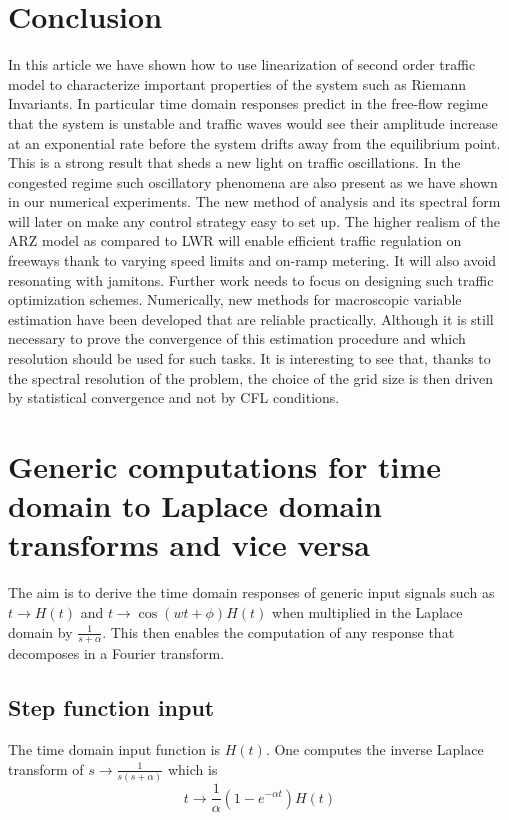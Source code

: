 \documentclass[preprint]{elsarticle}
\begin{document}
\section{Conclusion}
In this article we have shown how to use linearization of second order traffic model to characterize important properties of the system such as Riemann Invariants. In particular time domain responses predict in the free-flow regime that the system is unstable and traffic waves would see their amplitude increase at an exponential rate before the system drifts away from the equilibrium point. This is a strong result that sheds a new light on traffic oscillations. In the congested regime such oscillatory phenomena are also present as we have shown in our numerical experiments. The new method of analysis and its spectral form will later on make any control strategy easy to set up. The higher realism of the ARZ model as compared to LWR will enable efficient traffic regulation on freeways thank to varying speed limits and on-ramp metering. It will also avoid resonating with jamitons. Further work needs to focus on designing such traffic optimization schemes. Numerically, new methods for macroscopic variable estimation have been developed that are reliable practically. Although it is still necessary to prove the convergence of this estimation procedure and which resolution should be used for such tasks. It is interesting to see that, thanks to the spectral resolution of the problem, the choice of the grid size is then driven by statistical convergence and not by CFL conditions.


\newpage
\appendix
\section{Generic computations for time domain to Laplace domain transforms
and vice versa\label{sub:Generic-computations}}

The aim is to derive the time domain responses of generic input signals
such as $t\rightarrow H\left(t\right)$ and $t\rightarrow \cos\left(wt+\phi\right)H\left(t\right)$
when multiplied in the Laplace domain by $\frac{1}{s+\alpha}$. This
then enables the computation of any response that decomposes in a
Fourier transform.


\subsection{Step function input}

The time domain input function is $H\left(t\right)$. One computes
the inverse Laplace transform of $s\rightarrow\frac{1}{s\left(s+\alpha\right)}$
which is 
\[
t\rightarrow\frac{1}{\alpha}\left(1-e^{-\alpha t}\right)H\left(t\right)
\]
\end{document}
